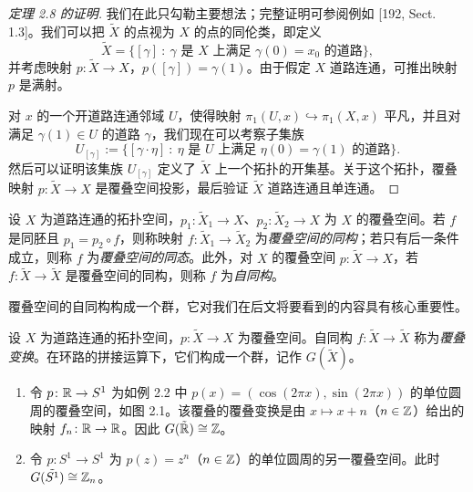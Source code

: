 \begin{proof}[定理 2.8 的证明]
我们在此只勾勒主要想法；完整证明可参阅例如 [192, Sect. 1.3]。我们可以把 $\tilde X$ 的点视为 $X$ 的点的同伦类，即定义
\[
\tilde X=\bigl\{[\gamma]\ :\ \gamma \text{ 是 } X \text{ 上满足 } \gamma(0)=x_0 \text{ 的道路}\bigr\},
\]
并考虑映射 $p\colon\tilde X\to X$，$p([\gamma])=\gamma(1)$。由于假定 $X$ 道路连通，可推出映射 $p$ 是满射。

对 $x$ 的一个开道路连通邻域 $U$，使得映射 $\pi_1(U,x)\hookrightarrow\pi_1(X,x)$ 平凡，并且对满足 $\gamma(1)\in U$ 的道路 $\gamma$，我们现在可以考察子集族
\[
U_{[\gamma]}:=\bigl\{[\gamma\cdot\eta]\ :\ \eta \text{ 是 } U \text{ 上满足 } \eta(0)=\gamma(1) \text{ 的道路}\bigr\}.
\]
然后可以证明该集族 $U_{[\gamma]}$ 定义了 $\tilde X$ 上一个拓扑的开集基。关于这个拓扑，覆叠映射 $p\colon\tilde X\to X$ 是覆叠空间投影，最后验证 $\tilde X$ 道路连通且单连通。
\end{proof}

\begin{definition}[2.10]
设 $X$ 为道路连通的拓扑空间，$p_1\colon\tilde X_1\to X$、$p_2\colon\tilde X_2\to X$ 为 $X$ 的覆叠空间。若 $f$ 是同胚且 $p_1=p_2\circ f$，则称映射 $f\colon\tilde X_1\to\tilde X_2$ 为\emph{覆叠空间的同构}；若只有后一条件成立，则称 $f$ 为\emph{覆叠空间的同态}。此外，对 $X$ 的覆叠空间 $p\colon\tilde X\to X$，若 $f\colon\tilde X\to\tilde X$ 是覆叠空间的同构，则称 $f$ 为\emph{自同构}。
\end{definition}

覆叠空间的自同构构成一个群，它对我们在后文将要看到的内容具有核心重要性。

\begin{definition}[2.11]
设 $X$ 为道路连通的拓扑空间，$p\colon\tilde X\to X$ 为覆叠空间。自同构 $f\colon\tilde X\to\tilde X$ 称为\emph{覆叠变换}。在环路的拼接运算下，它们构成一个群，记作 $G(\tilde X)$。
\end{definition}

\begin{example}[2.12]
\begin{enumerate}
\item 令 $p\colon\mathbb{R}\to S^1$ 为如例 2.2 中 $p(x)=(\cos(2\pi x),\sin(2\pi x))$ 的单位圆周的覆叠空间，如图 2.1。该覆叠的覆叠变换是由 $x\mapsto x+n$（$n\in\mathbb{Z}$）给出的映射 $f_n\colon\mathbb{R}\to\mathbb{R}$。因此 $G(\tilde{\mathbb{R}})\cong\mathbb{Z}$。
\item 令 $p\colon S^1\to S^1$ 为 $p(z)=z^n$（$n\in\mathbb{Z}$）的单位圆周的另一覆叠空间。此时 $G(\tilde{S^1})\cong\mathbb{Z}_n$。
\end{enumerate}
\end{example}

